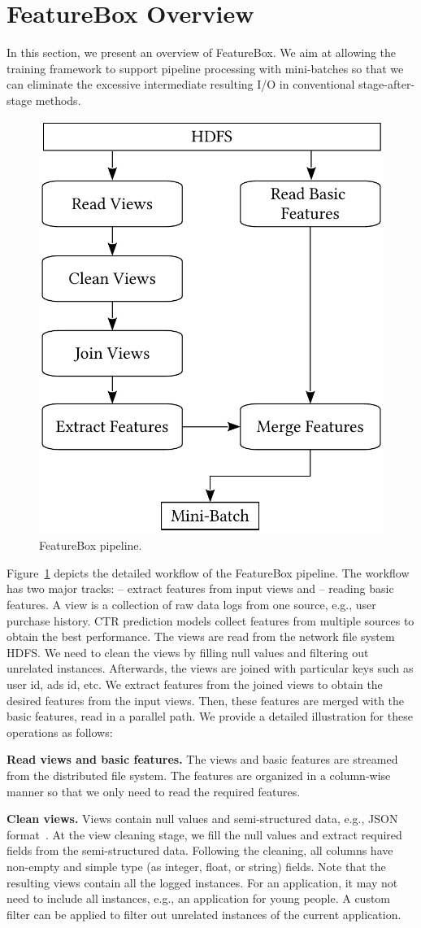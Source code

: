\documentclass[sigconf]{acmart}
\begin{document}
\section{FeatureBox Overview}
In this section, we present an overview of FeatureBox. We aim at allowing the training framework to support pipeline processing with mini-batches so that we can eliminate the excessive intermediate resulting I/O in conventional stage-after-stage methods.

\begin{figure}[htbp]
\centering
\includegraphics[width=.3\textwidth]{figs/pipeline}
\caption{FeatureBox pipeline.}\label{fig:pipeline}
\end{figure}

Figure~\ref{fig:pipeline} depicts the detailed workflow of the FeatureBox pipeline. 
The workflow has two major tracks: -- extract features from input views and -- reading basic features. 
A view is a collection of raw data logs from one source, e.g., user purchase history. CTR prediction models collect features from multiple sources to obtain the best performance. The views are read from the network file system HDFS. We need to clean the views by filling null values and filtering out unrelated instances. Afterwards, the views are joined with particular keys such as user id, ads id, etc. We extract features from the joined views to obtain the desired features from the input views. Then, these features are merged with the basic features, read in a parallel path. We provide a detailed illustration for these operations as follows:

\textbf{Read views and basic features.}
The views and basic features are streamed from the distributed file system. The features are organized in a column-wise manner so that we only need to read the required features. 

\textbf{Clean views.} 
Views contain null values and semi-structured data, e.g., JSON format~\cite{DBLP:conf/www/PezoaRSUV16}. 
At the view cleaning stage, we fill the null values and extract required fields from the semi-structured data. 
Following the cleaning, all columns have non-empty and simple type (as integer, float, or string) fields. Note that the resulting views contain all the logged instances. For an application, it may not need to include all instances, e.g., an application for young people. A custom filter can be applied to filter out unrelated instances of the current application.
\end{document}
